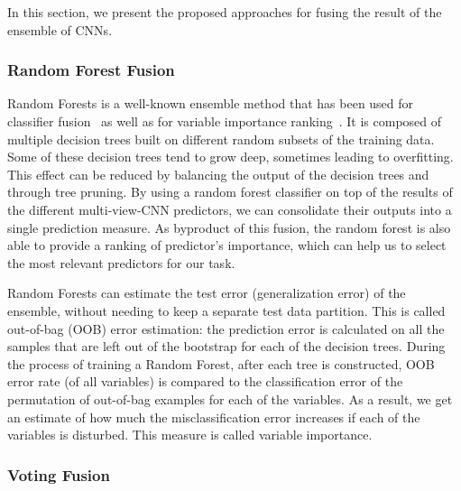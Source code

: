In this section, we present the proposed approaches for fusing the result of the ensemble of CNNs.

\subsubsection{Random Forest Fusion}

Random Forests is a well-known ensemble method that has been used for classifier fusion~\cite{kuncheva2014} as well as for variable importance ranking~\cite{breiman2001random, genuer2010variable}. 
It is composed of multiple decision trees built on different random subsets of the training data.
Some of these decision trees tend to grow deep, sometimes leading to overfitting. This effect can be reduced by balancing the output of the decision trees and through tree pruning. By using a random forest classifier on top of the results of the different multi-view-CNN predictors, we can consolidate their outputs into a single prediction measure. As byproduct of this fusion, the random forest is also able to provide a ranking of predictor's importance, which can help us to select the most relevant predictors for our task.

Random Forests can estimate the test error (generalization error) of the ensemble, without needing to keep a separate test data partition. This is called out-of-bag (OOB) error estimation: the prediction error is calculated on all the samples that are left out of the bootstrap for each of the decision trees. 
During the process of training a Random Forest, after each tree is constructed, OOB error rate (of all variables) is compared to the classification error of the permutation of out-of-bag examples for each of the variables. As a result, we get an estimate of how much the misclassification error increases if each of the variables is disturbed. This measure is called variable importance.


\subsubsection{Voting Fusion}

